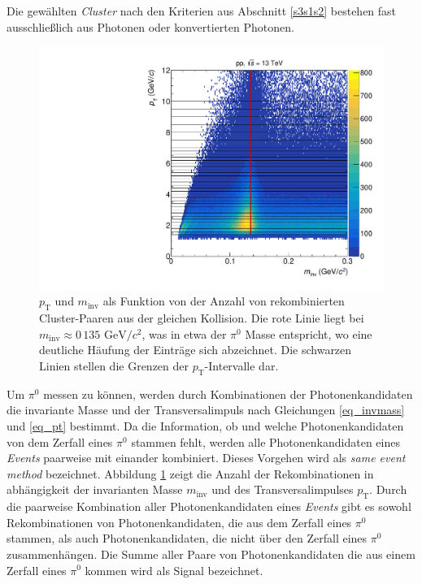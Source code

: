 Die gew\"ahlten \textit{Cluster} nach den Kriterien aus Abschnitt \ref{s3s1s2} bestehen fast ausschlie{\ss}lich aus Photonen oder konvertierten Photonen.
\newline
\begin{figure}[tp]
\centering
\includegraphics[width=.7\linewidth]{hInvMass_pT_Signal.pdf}
\caption{$p_\text{T}$ und $m_\text{inv}$ als Funktion von der Anzahl von rekombinierten  Cluster-Paaren aus der gleichen Kollision.
Die rote Linie liegt bei $m_{\text{inv}}\approx0\,135\text{ GeV/}c^{2}$, was in etwa der $\pi^{0}$ Masse entspricht, wo eine deutliche H\"aufung der Eintr\"age sich abzeichnet.
Die schwarzen Linien stellen die Grenzen der $p_{\text{T}}$-Intervalle dar.}
\label{figInvMassPt_a}
\end{figure}
Um $\pi^{0}$ messen zu k\"onnen, werden durch Kombinationen der Photonenkandidaten die invariante Masse und der Transversalimpuls nach Gleichungen \ref{eq_invmass} und \ref{eq_pt} bestimmt.
Da die Information, ob und welche Photonenkandidaten von dem Zerfall eines $\pi^{0}$ stammen fehlt, werden alle Photonenkandidaten eines \textit{Events} paarweise mit einander kombiniert.
Dieses Vorgehen wird als \textit{same event method} bezeichnet.
Abbildung \ref{figInvMassPt_a} zeigt die Anzahl der Rekombinationen in abh\"angigkeit der invarianten Masse $m_{\text{inv}}$ und des Transversalimpulses $p_{\text{T}}$.
Durch die paarweise Kombination aller Photonenkandidaten eines \textit{Events} gibt es sowohl Rekombinationen von Photonenkandidaten, die aus dem Zerfall eines $\pi^{0}$ stammen, als auch Photonenkandidaten, die nicht \"uber den Zerfall eines $\pi^{0}$ zusammenh\"angen.
Die Summe aller Paare von Photonenkandidaten die aus einem Zerfall eines $\pi^{0}$ kommen wird als Signal bezeichnet.
